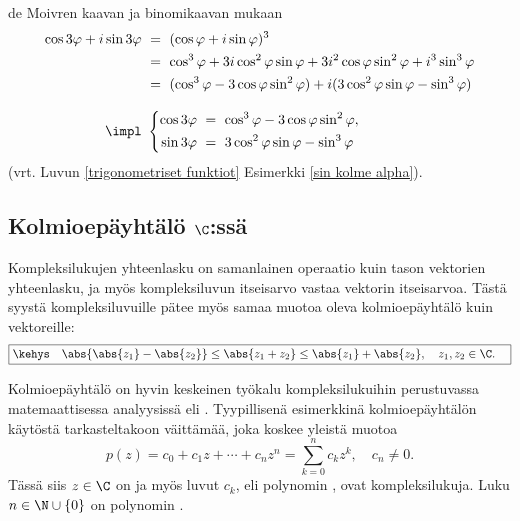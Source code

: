 \begin{Exa} de Moivren kaavan ja binomikaavan mukaan
\begin{align*}
\cos 3 \varphi + i \sin 3 \varphi\ &=\ (\cos \varphi + i \sin \varphi)^3 \\
&=\ \cos^3 \varphi + 3i \cos^2 \varphi \sin \varphi + 3 i^2 \cos \varphi \sin^2 \varphi 
                                                    +i^3 \sin^3 \varphi \\
&=\ (\cos^3 \varphi - 3\cos \varphi \sin^2 \varphi) + i(3 \cos^2 \varphi \sin \varphi 
                                                    - \sin^3 \varphi) \\[3mm]
\impl \ &\left\{
\begin{aligned}
\cos 3 \varphi\ &=\ \cos^3 \varphi - 3 \cos \varphi \sin^2 \varphi, \\
\sin 3 \varphi\ &=\ 3 \cos^2 \varphi \sin \varphi - \sin^3 \varphi
\end{aligned} \right.
\end{align*}
(vrt. Luvun \ref{trigonometriset funktiot} Esimerkki \ref{sin kolme alpha}). \loppu
\end{Exa}

\subsection*{Kolmioepäyhtälö $\C$:ssä}

Kompleksilukujen yhteenlasku on samanlainen operaatio kuin tason vektorien yhteenlasku, ja
myös kompleksiluvun itseisarvo vastaa vektorin itseisarvoa. Tästä syystä kompleksiluvuille
pätee myös samaa muotoa oleva kolmioepäyhtälö kuin vektoreille:
\[
\boxed{\kehys\quad \abs{\abs{z_1}-\abs{z_2}} \le \abs{z_1 + z_2} \leq \abs{z_1} + \abs{z_2}, 
                                                                 \quad z_1,z_2 \in \C. \quad}
\]

Kolmioepäyhtälö on hyvin keskeinen työkalu kompleksilukuihin perustuvassa matemaattisessa
analyysissä eli . Tyypillisenä esimerkkinä kolmioepäyhtälön käytöstä 
tarkasteltakoon väittämää, joka koskee yleistä
 muotoa
\[
p(z) = c_0 + c_1z + \cdots + c_nz^n = \sum_{k=0}^{n} c_k z^k, \quad c_n \neq 0. 
\]
Tässä siis $z \in \C$ on  ja myös luvut $c_k$, eli polynomin
, ovat kompleksilukuja. Luku $n\in\N\cup\{0\}$ on polynomin .

